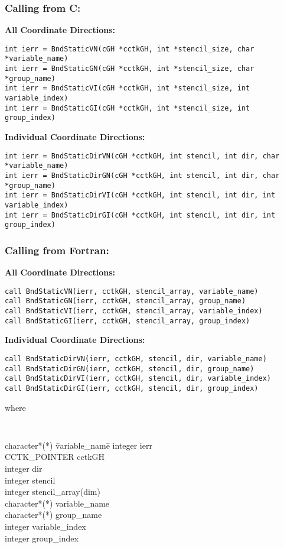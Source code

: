 \documentclass{article}
\begin{document}
\subsubsection*{Calling from C:}

{\bf All Coordinate Directions:}
\begin{verbatim}
int ierr = BndStaticVN(cGH *cctkGH, int *stencil_size, char *variable_name)
int ierr = BndStaticGN(cGH *cctkGH, int *stencil_size, char *group_name)
int ierr = BndStaticVI(cGH *cctkGH, int *stencil_size, int variable_index)
int ierr = BndStaticGI(cGH *cctkGH, int *stencil_size, int group_index)
\end{verbatim}

\noindent
{\bf Individual Coordinate Directions:}
\begin{verbatim}
int ierr = BndStaticDirVN(cGH *cctkGH, int stencil, int dir, char *variable_name)
int ierr = BndStaticDirGN(cGH *cctkGH, int stencil, int dir, char *group_name)
int ierr = BndStaticDirVI(cGH *cctkGH, int stencil, int dir, int variable_index)
int ierr = BndStaticDirGI(cGH *cctkGH, int stencil, int dir, int group_index)
\end{verbatim}

\subsubsection*{Calling from Fortran:}

{\bf All Coordinate Directions:}
\begin{verbatim}
call BndStaticVN(ierr, cctkGH, stencil_array, variable_name)
call BndStaticGN(ierr, cctkGH, stencil_array, group_name)
call BndStaticVI(ierr, cctkGH, stencil_array, variable_index)
call BndStaticGI(ierr, cctkGH, stencil_array, group_index)
\end{verbatim}

\noindent
{\bf Individual Coordinate Directions:}
\begin{verbatim}
call BndStaticDirVN(ierr, cctkGH, stencil, dir, variable_name)
call BndStaticDirGN(ierr, cctkGH, stencil, dir, group_name)
call BndStaticDirVI(ierr, cctkGH, stencil, dir, variable_index)
call BndStaticDirGI(ierr, cctkGH, stencil, dir, group_index)
\end{verbatim}
where
{\tt
\begin{tabbing}
character*(*) \= variable\_name\=\kill
integer \> ierr \\
CCTK\_POINTER \> cctkGH\\
integer \> dir\\
integer \> stencil\\
integer \> stencil\_array(dim)\\
character*(*) \> variable\_name\\
character*(*) \> group\_name\\
integer \> variable\_index\\
integer \> group\_index\\
\end{tabbing}
}
\end{document}
